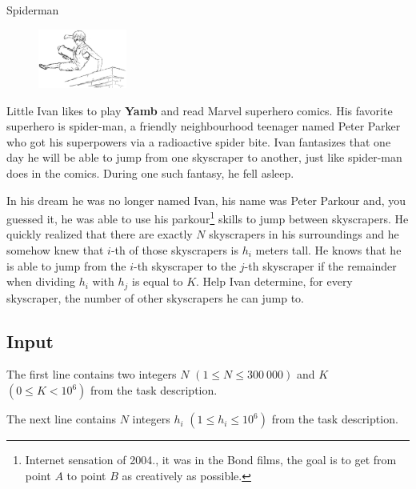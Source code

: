 \begin{statement}[
  problempoints=70,
  timelimit=2 seconds,
  memorylimit=512 MiB,
]{Spiderman}

\setlength\intextsep{-0.1cm}
\begin{figure}
\centering
\includegraphics[width=0.26\textwidth]{img/spiderman.png}
\end{figure}

Little Ivan likes to play \textbf{Yamb} and read Marvel superhero comics.
His favorite superhero is spider-man, a friendly neighbourhood teenager
named Peter Parker who got his superpowers via a radioactive spider bite.
Ivan fantasizes that one day he will be able to jump from one skyscraper to
another, just like spider-man does in the comics. During one such fantasy, he
fell asleep.

In his dream he was no longer named Ivan, his name was Peter Parkour and, you
guessed it, he was able to use his parkour\footnote{Internet sensation of
2004., it was in the Bond films, the goal is to get from point $A$ to point
$B$ as creatively as possible.} skills to jump between skyscrapers. He
quickly realized that there are exactly $N$ skyscrapers in his surroundings
and he somehow knew that $i$-th of those skyscrapers is $h_i$ meters tall. He
knows that he is able to jump from the $i$-th skyscraper to the $j$-th
skyscraper if the remainder when dividing $h_i$ with $h_j$ is equal to $K$.
Help Ivan determine, for every skyscraper, the number of other skyscrapers he
can jump to.

\subsection*{Input}
The first line contains two integers $N$ $(1 \le N \le 300\ 000)$ and $K$
$(0 \le K < 10^6)$ from the task description.

The next line contains $N$ integers $h_i$ $(1 \le h_i \le 10^6)$ from the task
description.


\end{statement}
